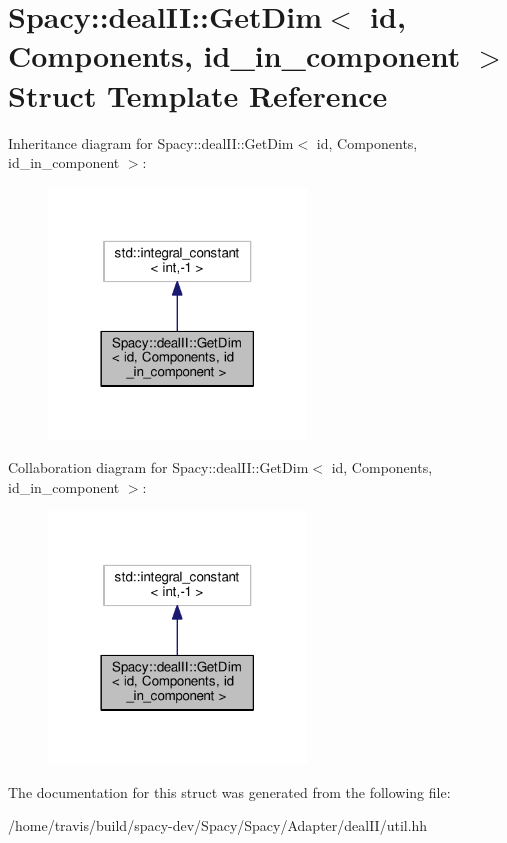 \hypertarget{structSpacy_1_1dealII_1_1GetDim}{\section{Spacy\-:\-:deal\-I\-I\-:\-:Get\-Dim$<$ id, Components, id\-\_\-in\-\_\-component $>$ Struct Template Reference}
\label{structSpacy_1_1dealII_1_1GetDim}
}


Inheritance diagram for Spacy\-:\-:deal\-I\-I\-:\-:Get\-Dim$<$ id, Components, id\-\_\-in\-\_\-component $>$\-:
\nopagebreak
\begin{figure}[H]
\begin{center}
\leavevmode
\includegraphics[width=194pt]{structSpacy_1_1dealII_1_1GetDim__inherit__graph}
\end{center}
\end{figure}


Collaboration diagram for Spacy\-:\-:deal\-I\-I\-:\-:Get\-Dim$<$ id, Components, id\-\_\-in\-\_\-component $>$\-:
\nopagebreak
\begin{figure}[H]
\begin{center}
\leavevmode
\includegraphics[width=194pt]{structSpacy_1_1dealII_1_1GetDim__coll__graph}
\end{center}
\end{figure}


The documentation for this struct was generated from the following file\-:\begin{DoxyCompactItemize}
\item 
/home/travis/build/spacy-\/dev/\-Spacy/\-Spacy/\-Adapter/deal\-I\-I/util.\-hh\end{DoxyCompactItemize}
